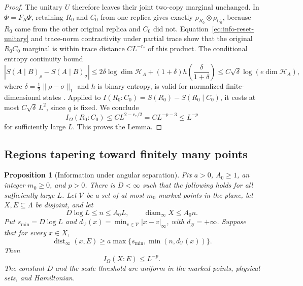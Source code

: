 \documentclass[11pt]{article}
\numberwithin{equation}{section}
\newtheorem{proposition}[theorem]{Proposition}
\theoremstyle{definition}
\theoremstyle{remark}
\DeclareMathOperator{\dist}{dist}
\DeclareMathOperator{\diam}{diam}
\newcommand{\norm}[1]{\lVert #1\rVert}
\begin{document}
\begin{proof}
The unitary $U$ therefore leaves their joint two-copy marginal unchanged.
In $\Phi=F_R\Psi$, retaining $R_0$ and $C_0$ from one replica gives
exactly $\rho_{R_0}\otimes\rho_{C_0}$, because $R_0$ came from the
other original replica and $C_0$ did not.  Equation~\eqref{eq:info-reset-unitary}
and trace-norm contractivity under partial trace show that the original
$R_0C_0$ marginal is within trace distance $CL^{-r_*}$ of this product.
The conditional entropy continuity bound
\[
 |S(A\mid B)_\rho-S(A\mid B)_\sigma|
 \le 2\delta\log\dim\mathcal H_A
       +(1+\delta)h\left(\frac{\delta}{1+\delta}\right)
 \le C\sqrt\delta\log(e\dim\mathcal H_A),
\]
where $\delta=\tfrac12\norm{\rho-\sigma}_1$ and $h$ is binary entropy,
is valid for normalized finite-dimensional states
\cite{Winter2016}.  Applied to $I(R_0:C_0)=S(R_0)-S(R_0\mid C_0)$,
it costs at most $C\sqrt\delta\,L^2$, since $q$ is fixed.  We conclude
\[
 I_\Omega(R_0:C_0)\le CL^{2-r_*/2}=CL^{-p-3}\le L^{-p}
\]
for sufficiently large $L$.  This proves the Lemma.
\end{proof}

\subsection{Regions tapering toward finitely many points}

\begin{proposition}[Information under angular separation]
\label{prop:angular}
Fix $a>0$, $A_0\ge1$, an integer $m_0\ge0$, and $p>0$.
There is $D<\infty$ such that the following holds for all sufficiently
large $L$.  Let $\mathcal V$ be a set of at most $m_0$ marked points
in the plane, let $X,E\subseteq\Lambda$ be disjoint, and let
\[
 D\log L\le n\le A_0L,
 \qquad \diam_\infty X\le A_0n.
\]
Put $s_{\min}=D\log L$ and
$d_{\mathcal V}(x)=\min_{v\in\mathcal V}|x-v|_\infty$, with
$d_{\varnothing}=+\infty$.  Suppose that for every $x\in X$,
\begin{equation}
 \dist_\infty(x,E)
   \ge a\max\{s_{\min},\min(n,d_{\mathcal V}(x))\}.
 \label{eq:info-angular-separation}
\end{equation}
Then
\[
 I_\Omega(X:E)\le L^{-p}.
\]
The constant $D$ and the scale threshold are uniform in the marked
points, physical sets, and Hamiltonian.
\end{proposition}
\end{document}
